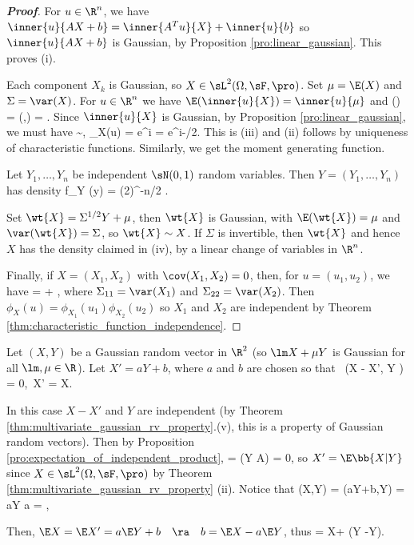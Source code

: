 \begin{proof}[\bf Proof]
For $u \in \R^n$, we have $\inner{u}{AX+b} = \inner{A^Tu}{X}+ \inner{u}{b}$ so $\inner{u}{AX+b}$ is Gaussian, by Proposition \ref{pro:linear_gaussian}. This proves (i).

Each component $X_k$ is Gaussian, so $X \in \sL^2(\Omega,\sF,\pro)$. Set $\mu = \E(X)$ and $\Sigma = \var(X)$. For $u \in \R^n$ we have $\E(\inner{u}{X}) = \inner{u}{\mu}$ and \be \var() =
\cov(,) = . \ee Since $\inner{u}{X}$ is Gaussian, by Proposition \ref{pro:linear_gaussian}, we must have \be {} \sim \sN{},\quad\quad
\phi_X(u) = \E e^{i} = e^{i-/2}. \ee This is (iii) and (ii) follows by uniqueness of characteristic functions. Similarly, we get the moment generating function.

Let $Y_1, \dots, Y_n$ be independent $\sN(0, 1)$ random variables. Then $Y = (Y_1,\dots, Y_n)$ has density
\be
f_Y (y) = (2\pi)^{-n/2} \exp{}.
\ee

Set $\wt{X} = \Sigma^{1/2}Y +\mu$, then $\wt{X}$ is Gaussian, with $\E(\wt{X}) = \mu$ and $\var(\wt{X} ) = \Sigma$, so $\wt{X} \sim X$. If $\Sigma$ is invertible, then $\wt{X}$ and hence $X$ has the density claimed in (iv), by a linear change of variables in $\R^n$.

Finally, if $X = (X_1,X_2)$ with $\cov(X_1,X_2) = 0$, then, for $u = (u_1, u_2)$, we have
\be
{} =  + ,
\ee
where $\Sigma_{11} = \var(X_1)$ and $\Sigma_{22} = \var(X_2)$. Then $\phi_X(u) = \phi_{X_1}(u_1)\phi_{X_2}(u_2)$ so $X_1$ and $X_2$ are independent by Theorem \ref{thm:characteristic_function_independence}.
\end{proof}

\begin{example}
Let $(X, Y)$ be a Gaussian random vector in $\R^2$ (so $\lm X + \mu Y$ is Gaussian for all $\lm,\mu \in \R$). Let $X' = aY + b$, where $a$ and $b$ are chosen so that
\be
{}\ \cov(X - X', Y ) = 0,\quad\quad {}\ \E X' = \E X.
\ee

In this case $X - X'$ and $Y$ are independent (by Theorem \ref{thm:multivariate_gaussian_rv_property}.(v), this is a property of Gaussian random vectors). Then by Proposition \ref{pro:expectation_of_independent_product},
\be
\E{} = \E{}\pro(Y \in A) = 0,
\ee
so $X' = \E\bb{X | Y}$ since $X\in \sL^2(\Omega,\sF,\pro)$ by Theorem \ref{thm:multivariate_gaussian_rv_property} (ii). Notice that
\be
\cov(X,Y) = \cov(aY+b,Y) = a\var Y \quad\ra\quad a = ,
\ee

Then, $\E X = \E X' = a\E Y + b \quad\ra\quad b = \E X - a\E Y$, thus
\be
\E{} = \E X+  (Y -\E Y).
\ee
\end{example}

